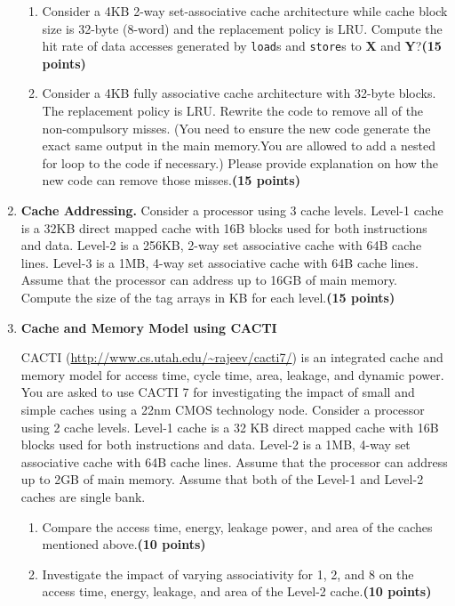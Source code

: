 \documentclass[a4paper, 11pt]{exam}
\begin{document}
\begin{enumerate}
\begin{enumerate}
\item Consider a 4KB 2-way set-associative cache architecture while cache block size is 32-byte (8-word) and the replacement policy is LRU. Compute the hit rate of data accesses generated by \texttt{load}s and \texttt{store}s to \textbf{X} and \textbf{Y}?\textbf{(15 points)}




\item Consider a 4KB fully associative cache architecture with 32-byte blocks. The replacement policy is LRU. Rewrite the code to remove  all of the non-compulsory misses. (You need to ensure the new code generate the exact same output in the main memory.You are allowed to add a nested for loop to the code if necessary.) Please provide explanation on how the new code can remove those misses.\textbf{(15 points)}


\end{enumerate}



\item \textbf {Cache Addressing.} Consider a processor using 3 cache levels. Level-1 cache is a
32KB direct mapped cache with 16B blocks used for both instructions and data. Level-2 is a
256KB, 2-way set associative cache with 64B cache lines. Level-3 is a
1MB, 4-way set associative cache with 64B cache lines. Assume that the processor can
address up to 16GB of main memory.  Compute the size of the tag arrays in KB for each level.\textbf{(15 points)}





\item \textbf{Cache and Memory Model using CACTI }

CACTI (\url{http://www.cs.utah.edu/~rajeev/cacti7/}) is an integrated cache and memory model for access time, cycle time, area, leakage, and dynamic power. You are asked to use CACTI 7 for investigating the impact of small and simple caches using a 22nm CMOS technology node. Consider a processor using 2 cache levels. Level-1 cache is a 32 KB direct mapped cache with 16B blocks used for both instructions and data. Level-2 is a 1MB, 4-way set associative cache with 64B cache lines. Assume that the processor can address up to 2GB of main memory. Assume that both of the Level-1 and Level-2 caches are single bank.
\begin{enumerate}
	\item Compare the access time, energy, leakage power, and area of the caches mentioned above.\textbf{(10 points)} 
    \item Investigate the impact of varying associativity for 1, 2, and 8 on the access time, energy, leakage, and area of the Level-2 cache.\textbf{(10 points)}

\end{enumerate}

\end{enumerate}
\end{document}
